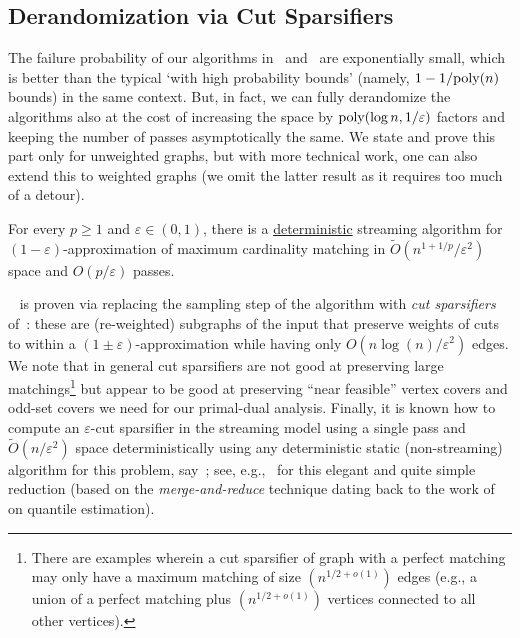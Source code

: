 \documentclass{theoretics}
\renewcommand{\geq}{\geqslant}
\newcommand{\Ot}{\widetilde{O}}
\newcommand{\eps}{\varepsilon}
\newcommand{\poly}{\mbox{\rm poly}}
\begin{document}
\subsection{Derandomization via Cut Sparsifiers}\label{sec:ext-derandomization}

The failure probability of our algorithms in~ and~ are exponentially small, which is better than the typical `with high probability bounds' (namely, $1-1/\poly{(n)}$ bounds) in the same context. 
But, in fact, we can fully derandomize the algorithms also at the cost of increasing the space by $\poly(\log{n},1/\eps)$ factors and keeping the number of passes asymptotically the same. 
We state and prove this part only for unweighted graphs, but with more technical work, one can also extend this to weighted graphs (we omit the latter result as it requires too much of a detour). 

\begin{corollary}\label{cor:deterministic} For every  $p \geq 1$ and  $\eps \in (0,1)$, there is a \underline{deterministic} streaming algorithm for $(1-\eps)$-approximation of maximum cardinality matching
	in $\Ot(n^{1+1/p}/\eps^{2})$ space and $O(p/\eps)$ passes. 
\end{corollary}

~ is proven via replacing the sampling step of the algorithm with \emph{cut sparsifiers} of~\cite{BenczurK96}: these are (re-weighted) subgraphs of the input
that preserve weights of cuts to within a $(1\pm \eps)$-approximation while having only $O(n\log{\!(n)}/\eps^2)$ edges. We note that in general cut sparsifiers are not good at preserving large matchings\footnote{There are examples wherein a cut sparsifier of graph with a perfect matching may only have a 
maximum matching of size $(n^{1/2+o(1)})$ edges (e.g., a union of a perfect matching plus $(n^{1/2+o(1)})$ vertices connected to all other vertices).} but appear to be good at preserving ``near feasible'' vertex covers and odd-set covers 
we need for our primal-dual analysis. Finally, it is known how to compute an $\eps$-cut sparsifier in the streaming model using a single pass and $\Ot(n/\eps^2)$ space deterministically using any deterministic static (non-streaming)
algorithm for this problem, say~\cite{BatsonSS09}; see, e.g.,~\cite{McGregor14} for this elegant and quite simple reduction (based on the \emph{merge-and-reduce} technique dating back to the work of~\cite{RajagopalanML98} on quantile estimation).  
\end{document}
